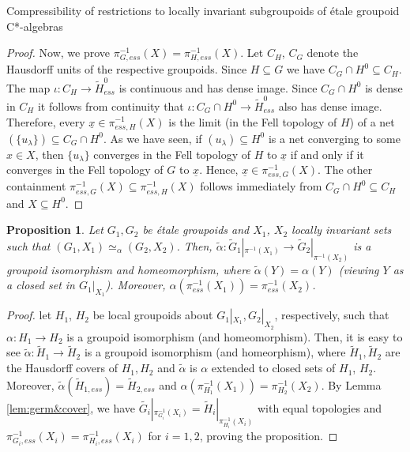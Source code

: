 \documentclass[a4paper, 12pt]{amsart}
\newtheorem{prp}[thm]{Proposition}
\theoremstyle{definition}
\theoremstyle{remark}
\numberwithin{equation}{section}
\begin{document}
\begin{section}{Compressibility of restrictions to locally invariant subgroupoids of \'etale groupoid C*-algebras}
\begin{proof}
    Now, we prove $\pi_{G,ess}^{-1}(X) = \pi^{-1}_{H,ess}(X)$. Let $C_{H}$, $C_{G}$ denote the Hausdorff units of the respective groupoids. Since $H\subseteq G$ we have $C_{G}\cap H^{0}\subseteq C_{H}$. The map $\iota:C_{H}\to \tilde{H}^{0}_{ess}$ is continuous and has dense image. Since $C_{G}\cap H^{0}$ is dense in $C_{H}$ it follows from continuity that $\iota:C_{G}\cap H^{0}\to \tilde{H}^{0}_{ess}$ also has dense image. Therefore, every $\underline{x}\in \pi^{-1}_{ess, H}(X)$ is the limit (in the Fell topology of $H$) of a net $(\{u_{\lambda}\})\subseteq C_{G}\cap H^{0}$. As we have seen, if $(u_{\lambda})\subseteq H^{0}$ is a net converging to some $x\in X$, then $\{u_{\lambda}\}$ converges in the Fell topology of $H$ to $\underline{x}$ if and only if it converges in the Fell topology of $G$ to $\underline{x}$. Hence, $\underline{x}\in \pi^{-1}_{ess, G}(X)$. The other containment $\pi^{-1}_{ess, G}(X)\subseteq \pi^{-1}_{ess, H}(X)$ follows immediately from $C_{G}\cap H^{0}\subseteq C_{H}$ and $X\subseteq H^{0}$.
\end{proof}

\begin{prp}
\label{prp:germ&cover}
    Let $G_{1}, G_{2}$ be \'etale groupoids and $X_{1}$, $X_{2}$ locally invariant sets such that $(G_{1}, X_{1})\simeq_{\alpha} (G_{2}, X_{2})$. Then, $\tilde{\alpha}:\tilde{G}_{1}|_{\pi^{-1}(X_{1})}\to \tilde{G}_{2}|_{\pi^{-1}(X_{2})}$ is a groupoid isomorphism and homeomorphism, where $\tilde{\alpha}(Y) = \alpha(Y)$ (viewing $Y$ as a closed set in $G_{1}|_{X_{1}}$). Moreover, $\alpha(\pi^{-1}_{ess}(X_{1})) = \pi^{-1}_{ess}(X_{2})$.
\end{prp}
\begin{proof}
    let $H_{1}$, $H_{2}$ be local groupoids about $G_{1}|_{X_{1}}, G_{2}|_{X_{2}}$, respectively, such that $\alpha:H_{1}\to H_{2}$ is a groupoid isomorphism (and homeomorphism). Then, it is easy to see $\tilde{\alpha}:\tilde{H}_{1}\to \tilde{H}_{2}$ is a groupoid isomorphism (and homeorphism), where $\tilde{H}_{1},\tilde{H}_{2}$ are the Hausdorff covers of $H_{1}, H_{2}$ and $\tilde{\alpha}$ is $\alpha$ extended to closed sets of $H_{1}$, $H_{2}$. Moreover, $\tilde{\alpha}(\tilde{H}_{1,ess}) = \tilde{H}_{2,ess}$ and $\alpha(\pi_{H_{1}}^{-1}(X_{1})) = \pi^{-1}_{H_{2}}(X_{2})$. By Lemma \ref{lem:germ&cover}, we have $\tilde{G_{i}}|_{\pi_{G_{i}}^{-1}(X_{i})} = \tilde{H}_{i}|_{\pi_{H_{i}}^{-1}(X_{i})}$ with equal topologies and $\pi_{G_{i},ess}^{-1}(X_{i}) = \pi^{-1}_{H_{i},ess}(X_{i})$ for $i=1,2$, proving the proposition.
\end{proof}


\end{section}
\end{document}
